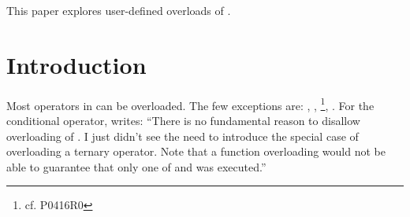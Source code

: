 \newcommand\wgTitle{Making operator?: overloadable}
\newcommand\wgName{Matthias Kretz <m.kretz@gsi.de>}
\newcommand\wgDocumentNumber{D0917R0}
\newcommand\wgGroup{EWG}

\usepackage{mymacros}
\usepackage{wg21}
\usepackage{underscore}



\newcommand\simd[1][]{\type{simd#1}\xspace}
\newcommand\simdT{\type{simd<T>}\xspace}
\newcommand\valuetype{\type{value\_type}\xspace}
\newcommand\referencetype{\type{reference}\xspace}
\newcommand\whereexpression{\type{where\_expression}\xspace}
\newcommand\simdcast{\code{simd\_cast}\xspace}
\newcommand\mask[1][]{\type{simd\_mask#1}\xspace}
\newcommand\maskT{\type{simd\_mask<T>}\xspace}
\newcommand\fixedsizeN{\type{simd\_abi::fixed\_size<N>}\xspace}
\newcommand\fixedsizescoped{\type{simd\_abi::fixed\_size}\xspace}
\newcommand\fixedsize{\type{fixed\_size}\xspace}
\newcommand\simdEP{\code{execution::}\type{simd}\xspace}
\newcommand\seqEP{\code{execution::}\type{seq}\xspace}

\usepackage{pifont}

\newcommand\foralli[1][]{for all \code i $\in$ \code{[0, #1size())}\xspace}
\newcommand\forallmaskedi[1]{%
  for all \code i
  $\in \{j \in \mathbb{N}_0 | j < \code{size()} ⋀ \code{#1[}j\code{]}\}$%
  \xspace%
}
\newcommand\chck{\item[\color{black}\ensuremath{\checkmark}]}
\newcommand\todo{\item[\color{black}\ding{46}] \color{gray}}
\newcommand\itemheader[1]{\item[] \hfill \textcolor{gray}{\textsc{#1}}}


\begin{wgTitlepage}
  This paper explores user-defined overloads of .
\end{wgTitlepage}

\pagestyle{scrheadings}
\section{Introduction}
Most operators in \CC{} can be overloaded.
The few exceptions are: , \code{::}, \footnote{cf. P0416R0}, .
For the conditional operator, \textcite{StrFaq} writes:
“There is no fundamental reason to disallow overloading of .
I just didn't see the need to introduce the special case of overloading a ternary operator.
Note that a function overloading  would not be able to guarantee that only one of  and  was executed.”

